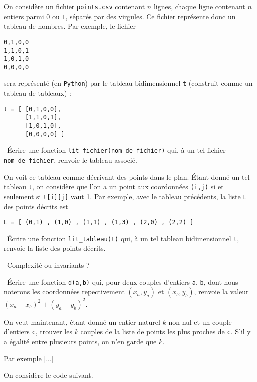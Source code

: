 \exer{}
\setcounter{numques}{0}

On considère un fichier \texttt{points.csv} contenant $n$ lignes, chaque ligne contenant $n$ entiers parmi $0$ ou $1$, séparés par des virgules. 
Ce fichier représente donc un tableau de nombres. 
Par exemple, le fichier 
\begin{lstlisting}0,1,0,0
1,1,0,1
1,0,1,0
0,0,0,0
\end{lstlisting}sera représenté (en \texttt{Python}) par le tableau bidimensionnel \texttt{t} (construit comme un tableau de tableaux) : 
\begin{lstlisting}t = [ [0,1,0,0],
      [1,1,0,1],
      [1,0,1,0],
      [0,0,0,0] ]
\end{lstlisting}
\medskip

\question\ Écrire une fonction \texttt{lit\_fichier(nom\_de\_fichier)} qui, à un tel fichier \texttt{nom\_de\_fichier}, renvoie le tableau associé. 

\medskip 

On voit ce tableau comme décrivant des points dans le plan. Étant donné un tel tableau \texttt{t}, on considère que l'on a un point aux coordonnées \texttt{(i,j)} si et seulement si \texttt{t[i][j]} vaut 1. 
Par exemple, avec le tableau précédents, la liste \texttt{L} des points décrits est 
\begin{lstlisting}
L = [ (0,1) , (1,0) , (1,1) , (1,3) , (2,0) , (2,2) ] 
\end{lstlisting}
\medskip

\question\ Écrire une fonction \texttt{lit\_tableau(t)} qui, à un tel tableau bidimensionnel \texttt{t}, renvoie la liste des points décrits. 

\question\ Complexité ou invariants ? 

\medskip 

\question\ Écrire une fonction \texttt{d(a,b)} qui, pour deux couples d'entiers \texttt{a}, \texttt{b}, dont nous noterons les coordonnées repectivement $(x_a,y_a)$ et $(x_b,y_b)$, renvoie la valeur $(x_a-x_b)^2 + (y_a-y_b)^2$. 

\medskip

On veut maintenant, étant donné un entier naturel $k$ non nul et un couple d'entiers \texttt{c}, trouver les $k$ couples de la liste de points les plus proches de \texttt{c}. S'il y a égalité entre plusieurs points, on n'en garde que $k$. 

Par exemple [...]

\medskip

On considère le code suivant. 

